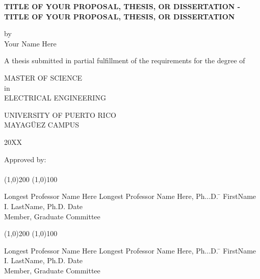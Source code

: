 

\thispagestyle{empty}
\begin{center}
\begin{singlespace}
\textbf{TITLE OF YOUR PROPOSAL, THESIS, OR DISSERTATION - TITLE OF YOUR PROPOSAL, THESIS, OR DISSERTATION}
\end{singlespace}
\vspace{4 mm}
by
\\
\vspace{4 mm}
Your Name Here %
\vspace{4 mm}
\begin{singlespace}
A thesis submitted in partial fulfillment of the requirements for the degree of %
\end{singlespace}
\vspace{4 mm}
MASTER OF SCIENCE %
\\
in
\\
ELECTRICAL ENGINEERING %
\\
\vspace{4 mm}
\begin{singlespace}

UNIVERSITY OF PUERTO RICO
\\
MAYAG\"UEZ CAMPUS
\end{singlespace}

20XX %
\end{center}
\bigskip



  \noindent Approved by:
\\
\\
\line(1,0){200} \hspace{40 mm} \line(1,0){100}\\
  \noindent
\vspace{-1.75\baselineskip}
\begin{tabbing}
Longest Professor Name Here Longest Professor Name Here, Ph...D. \=  \kill 
FirstName I. LastName, Ph.D. \>  Date\\Member, Graduate Committee  %
\end{tabbing} 



  \noindent
\line(1,0){200} \hspace{40 mm} \line(1,0){100}\\
 \noindent
\vspace{-1.75\baselineskip}
\begin{tabbing}
Longest Professor Name Here Longest Professor Name Here, Ph...D. \=  \kill 
FirstName I. LastName, Ph.D. \>  Date\\ Member, Graduate Committee  %
\end{tabbing}



